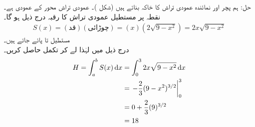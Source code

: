 حل:\quad
{} \quad {}\quad
ہم پچر اور نمائندہ عمودی تراش کا خاکہ بناتے ہیں (شکل )۔ عمودی تراش  محور کے عمودی ہے۔\\
\quad {}
\quad
نقطہ  پر مستطیل عمودی تراش کا رقبہ درج ذیل ہو گا۔
\begin{align*}
S(x)=(\text{قد})(\text{چوڑائی})=(x)(2\sqrt{9-x^2})=2x\sqrt{9-x^2}
\end{align*}
\quad
{}\quad
مستطیل  تا  پائے جاتے ہیں۔\\
\quad {}
درج ذیل میں  لہٰذا  لے کر تکمل حاصل کریں۔
\begin{align*}
H=\int_a^bS(x)\dif x&=\int_0^32x\sqrt{9-x^2}\dif x\\
&=\left.-\frac{2}{3}(9-x^2)^{3/2}\right\vert_0^3\\
&=0+\frac{2}{3}(9)^{3/2}\\
&=18
\end{align*}

